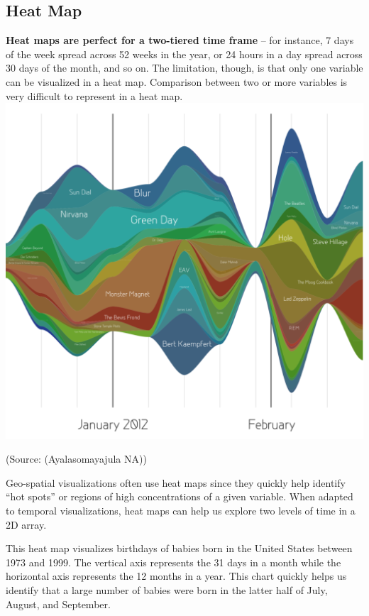 \documentclass[]{book}
\theoremstyle{definition}
\theoremstyle{definition}
\theoremstyle{definition}
\theoremstyle{remark}
\begin{document}
\subsection{Heat Map}\label{heat-map}

\textbf{Heat maps are perfect for a two-tiered time frame} -- for
instance, 7 days of the week spread across 52 weeks in the year, or 24
hours in a day spread across 30 days of the month, and so on. The
limitation, though, is that only one variable can be visualized in a
heat map. Comparison between two or more variables is very difficult to
represent in a heat map. \includegraphics{images/aya-stream.png}

(Source: (Ayalasomayajula NA))

Geo-spatial visualizations often use heat maps since they quickly help
identify ``hot spots'' or regions of high concentrations of a given
variable. When adapted to temporal visualizations, heat maps can help us
explore two levels of time in a 2D array.

This heat map visualizes birthdays of babies born in the United States
between 1973 and 1999. The vertical axis represents the 31 days in a
month while the horizontal axis represents the 12 months in a year. This
chart quickly helps us identify that a large number of babies were born
in the latter half of July, August, and September.
\end{document}
